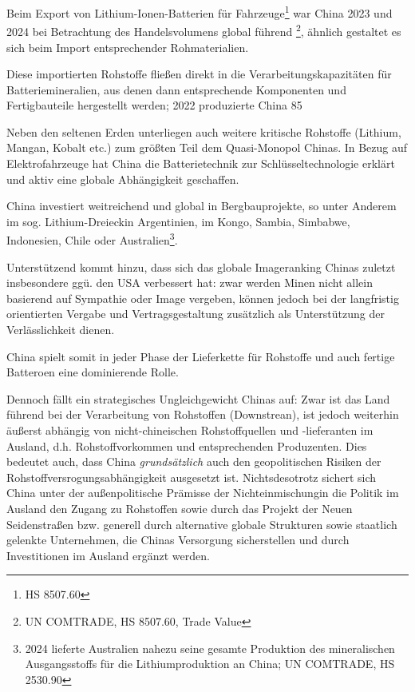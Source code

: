 \documentclass[12pt,a4paper,oneside]{book} %
\begin{document}
{Beim Export von Lithium-Ionen-Batterien für Fahrzeuge\footnote{HS 8507.60} war China 2023 und 2024 bei Betrachtung des Handelsvolumens global führend \footnote{UN COMTRADE, HS 8507.60, Trade Value}, ähnlich gestaltet es sich beim Import entsprechender Rohmaterialien.

Diese importierten Rohstoffe fließen direkt in die Verarbeitungskapazitäten für Batteriemineralien, aus denen dann entsprechende Komponenten und Fertigbauteile hergestellt werden; 2022 produzierte China 85 %

Neben den seltenen Erden unterliegen auch weitere kritische Rohstoffe (Lithium, Mangan, Kobalt etc.) zum größten Teil dem Quasi-Monopol Chinas. In Bezug auf Elektrofahrzeuge hat China die Batterietechnik zur Schlüsseltechnologie erklärt und aktiv eine globale Abhängigkeit geschaffen.\autocite{Lee, Mayer-Kuckuck, China, S. 75}

China investiert weitreichend und global in Bergbauprojekte, so unter Anderem im sog. \glqq Lithium-Dreieck\grqq in Argentinien,\autocite{https://www.eia.gov/todayinenergy/detail.php?id=65305} im Kongo, Sambia, Simbabwe, Indonesien, Chile oder Australien\footnote{2024 lieferte Australien nahezu seine gesamte Produktion des mineralischen Ausgangsstoffs für die Lithiumproduktion an China; UN COMTRADE, HS 2530.90}.

Unterstützend kommt hinzu, dass sich das globale Imageranking Chinas zuletzt insbesondere ggü. den USA verbessert hat: zwar werden Minen nicht allein basierend auf Sympathie oder Image vergeben, können jedoch bei der langfristig orientierten Vergabe und Vertragsgestaltung zusätzlich als Unterstützung der Verlässlichkeit dienen.\autocite{https://www.pewresearch.org/global/2026/07/15/people-in-many-countries-now-view-china-more-positively-than-the-u-s/?utm_source=brunchcrunch&utm_medium=brunchcrunch&utm_campaign=brunchcrunch}

China spielt somit in jeder Phase der Lieferkette für Rohstoffe und auch fertige Batteroen eine dominierende Rolle. 


Dennoch fällt ein strategisches Ungleichgewicht Chinas auf: Zwar ist das Land führend bei der Verarbeitung von Rohstoffen (Downstrean), ist jedoch weiterhin äußerst abhängig von nicht-chineischen Rohstoffquellen und -lieferanten im Ausland, d.h. Rohstoffvorkommen und entsprechenden Produzenten. Dies bedeutet auch, dass China \textit{grundsätzlich} auch den geopolitischen Risiken der Rohstoffversrogungsabhängigkeit ausgesetzt ist. Nichtsdesotrotz sichert sich China unter der außenpolitische Prämisse der \glqq Nichteinmischung\grqq in die Politik im Ausland den Zugang zu Rohstoffen sowie durch das Projekt der Neuen Seidenstraßen bzw. generell durch alternative globale Strukturen sowie staatlich gelenkte Unternehmen, die Chinas Versorgung sicherstellen und durch Investitionen im Ausland ergänzt werden.\autocite{Frenz 2025, A. 85}

}
\end{document}
